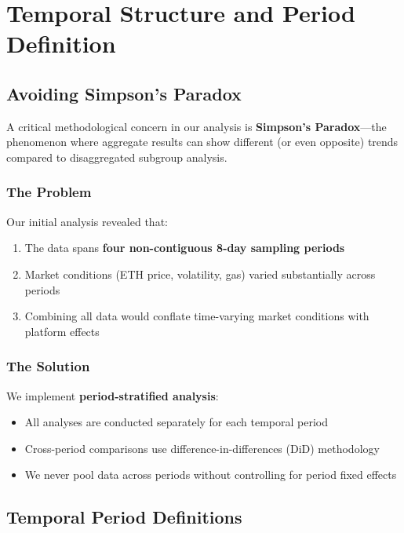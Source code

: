 \documentclass[11pt,a4paper]{article}
\begin{document}
\section{Temporal Structure and Period Definition}

\subsection{Avoiding Simpson's Paradox}

A critical methodological concern in our analysis is \textbf{Simpson's Paradox}---the phenomenon where aggregate results can show different (or even opposite) trends compared to disaggregated subgroup analysis.

\subsubsection{The Problem}

Our initial analysis revealed that:
\begin{enumerate}
    \item The data spans \textbf{four non-contiguous 8-day sampling periods}
    \item Market conditions (ETH price, volatility, gas) varied substantially across periods
    \item Combining all data would conflate time-varying market conditions with platform effects
\end{enumerate}

\subsubsection{The Solution}

We implement \textbf{period-stratified analysis}:
\begin{itemize}
    \item All analyses are conducted separately for each temporal period
    \item Cross-period comparisons use difference-in-differences (DiD) methodology
    \item We never pool data across periods without controlling for period fixed effects
\end{itemize}

\subsection{Temporal Period Definitions}
\end{document}

